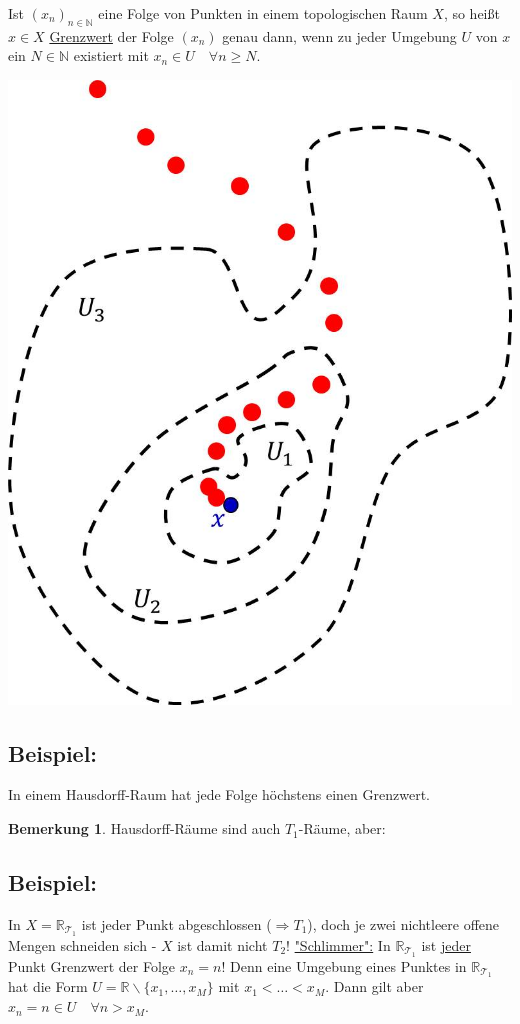 \documentclass[a4paper,11pt,notitlepage]{report}
\theoremstyle{definition}
\newtheorem{remark}{Bemerkung}[chapter]
\newcommand{\R}{{\ensuremath{\mathbb{R}}}}
\newcommand{\N}{{\ensuremath{\mathbb{N}}}}
\newenvironment{bsp}[1]
{
\setlength{\fboxsep}{10pt}
\subsection*{Beispiel: #1}
\begin{upshape}
}
{
\end{upshape}
}
\newenvironment{definition}[1]{
	\begin{definitions}
	\marginnote{\emph{#1}}
}{\end{definitions}}
\begin{document}
\begin{definition}{Grenzwert}
Ist $(x_n)_{n \in \N}$ eine Folge von Punkten in einem topologischen Raum $X$, so heißt $x \in X$ \underline{Grenzwert} der Folge $(x_n)$ genau dann, wenn zu jeder Umgebung $U$ von $x$ ein $N \in \N$ existiert mit $x_n \in U \quad \forall n \geq N$. 
\begin{center}
	\includegraphics[scale=0.3]{images/Grenzwert.jpg}
\end{center}
\end{definition}

\begin{bsp}{}
In einem Hausdorff-Raum hat jede Folge höchstens einen Grenzwert.
\end{bsp}

\begin{remark}
Hausdorff-Räume sind auch $T_1$-Räume, aber:
\end{remark}

\begin{bsp}{}
	In $X=\R_{\mathcal{T}_1}$ ist jeder Punkt abgeschlossen ($\Rightarrow T_1$), doch je zwei nichtleere offene Mengen schneiden sich - $X$ ist damit nicht $T_2$!
	\underline{"Schlimmer":} In $\R_{\mathcal{T}_1}$ ist \underline{jeder} Punkt Grenzwert der Folge $x_n = n$!
	Denn eine Umgebung eines Punktes in $\R_{\mathcal{T}_1}$ hat die Form $U = \R \backslash \{x_1, \ldots, x_M\}$ mit $x_1 < \ldots < x_M$. Dann gilt aber $x_n = n \in U \quad \forall n > x_M$.
\end{bsp}
\end{document}
